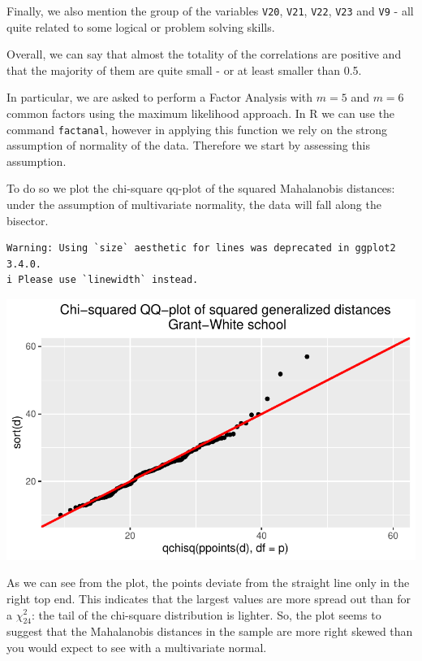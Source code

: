 \documentclass[
  letterpaper,
  DIV=11,
  numbers=noendperiod]{scrartcl}
\begin{document}
Finally, we also mention the group of the variables \texttt{V20},
\texttt{V21}, \texttt{V22}, \texttt{V23} and \texttt{V9} - all quite
related to some logical or problem solving skills.

Overall, we can say that almost the totality of the correlations are
positive and that the majority of them are quite small - or at least
smaller than 0.5.

In particular, we are asked to perform a Factor Analysis with \(m=5\)
and \(m=6\) common factors using the maximum likelihood approach. In R
we can use the command \texttt{factanal}, however in applying this
function we rely on the strong assumption of normality of the data.
Therefore we start by assessing this assumption.

To do so we plot the chi-square qq-plot of the squared Mahalanobis
distances: under the assumption of multivariate normality, the data will
fall along the bisector.

\begin{verbatim}
Warning: Using `size` aesthetic for lines was deprecated in ggplot2 3.4.0.
i Please use `linewidth` instead.
\end{verbatim}

\includegraphics{ProblemSet2_files/figure-pdf/unnamed-chunk-9-1.pdf}

As we can see from the plot, the points deviate from the straight line
only in the right top end. This indicates that the largest values are
more spread out than for a \(\chi_{24}^2\): the tail of the chi-square
distribution is lighter. So, the plot seems to suggest that the
Mahalanobis distances in the sample are more right skewed than you would
expect to see with a multivariate normal.
\end{document}
